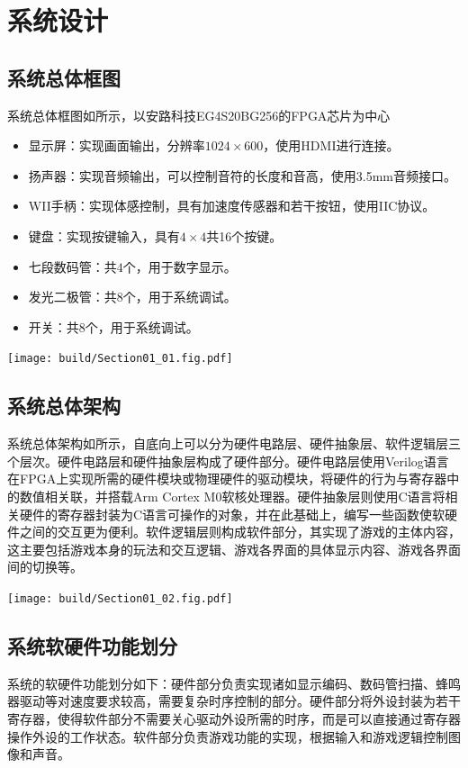 \section{系统设计}

\subsection{系统总体框图}

系统总体框图如所示，以安路科技EG4S20BG256的FPGA芯片为中心
\begin{itemize}
    \item 显示屏：实现画面输出，分辨率$1024\times 600$，使用HDMI进行连接。
    \item 扬声器：实现音频输出，可以控制音符的长度和音高，使用3.5mm音频接口。
    \item WII手柄：实现体感控制，具有加速度传感器和若干按钮，使用IIC协议。
    \item 键盘：实现按键输入，具有$4\times 4$共16个按键。
    \item 七段数码管：共$4$个，用于数字显示。
    \item 发光二极管：共$8$个，用于系统调试。
    \item 开关：共$8$个，用于系统调试。
\end{itemize}

\begin{Figure}[系统总体框图]
    \texttt{[image: build/Section01\_01.fig.pdf]}
\end{Figure}

\subsection{系统总体架构}
系统总体架构如所示，自底向上可以分为硬件电路层、硬件抽象层、软件逻辑层三个层次。硬件电路层和硬件抽象层构成了硬件部分。硬件电路层使用Verilog语言在FPGA上实现所需的硬件模块或物理硬件的驱动模块，将硬件的行为与寄存器中的数值相关联，并搭载Arm Cortex M0软核处理器。硬件抽象层则使用C语言将相关硬件的寄存器封装为C语言可操作的对象，并在此基础上，编写一些函数使软硬件之间的交互更为便利。软件逻辑层则构成软件部分，其实现了游戏的主体内容，这主要包括游戏本身的玩法和交互逻辑、游戏各界面的具体显示内容、游戏各界面间的切换等。

\begin{Figure}[系统总体架构]
    \texttt{[image: build/Section01\_02.fig.pdf]}
\end{Figure}

\subsection{系统软硬件功能划分}
系统的软硬件功能划分如下：硬件部分负责实现诸如显示编码、数码管扫描、蜂鸣器驱动等对速度要求较高，需要复杂时序控制的部分。硬件部分将外设封装为若干寄存器，使得软件部分不需要关心驱动外设所需的时序，而是可以直接通过寄存器操作外设的工作状态。软件部分负责游戏功能的实现，根据输入和游戏逻辑控制图像和声音。

